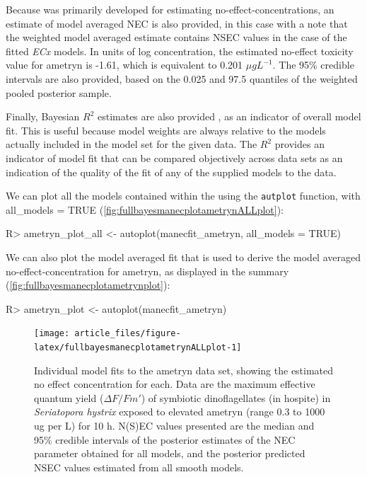 \documentclass[
  shortnames]{jss}
\begin{document}
Because  was primarily developed for estimating no-effect-concentrations, an estimate of model averaged NEC is also provided, in this case with a note that the weighted model averaged estimate contains NSEC \citep{Fisher2023} values in the case of the fitted \emph{ECx} models. In units of log concentration, the estimated no-effect toxicity value for ametryn is -1.61, which is equivalent to 0.201 \({\mu}gL^{-1}\). The 95\% credible intervals are also provided, based on the 0.025 and 97.5 quantiles of the weighted pooled posterior sample.

Finally, Bayesian \(R^2\) estimates are also provided \citep{gelman2019}, as an indicator of overall model fit. This is useful because model weights are always relative to the models actually included in the model set for the given data. The \(R^2\) provides an indicator of model fit that can be compared objectively across data sets as an indication of the quality of the fit of any of the supplied models to the data.

We can plot all the models contained within the  using the \texttt{autplot} function, with all\_models = TRUE (\autoref{fig:fullbayesmanecplotametrynALLplot}):

\begin{CodeChunk}
\begin{CodeInput}
R> ametryn_plot_all <- autoplot(manecfit_ametryn, all_models = TRUE)
\end{CodeInput}
\end{CodeChunk}

We can also plot the model averaged fit that is used to derive the model averaged no-effect-concentration for ametryn, as displayed in the summary (\autoref{fig:fullbayesmanecplotametrynplot}):

\begin{CodeChunk}
\begin{CodeInput}
R> ametryn_plot <- autoplot(manecfit_ametryn)
\end{CodeInput}
\end{CodeChunk}

\begin{CodeChunk}
\begin{figure}[!ht]

{\centering \texttt{[image: article\_files/figure-latex/fullbayesmanecplotametrynALLplot-1]} 

}

\caption{Individual model fits to the ametryn data set, showing the estimated no effect concentration for each. Data are the maximum effective quantum yield ($\Delta F / Fm'$) of symbiotic dinoflagellates (in hospite) in \textit{Seriatopora hystrix} exposed to elevated ametryn (range 0.3 to 1000 ug per L) for 10 h. N(S)EC values presented are the median and 95\% credible intervals of the posterior estimates of the NEC parameter obtained for all  models, and the posterior predicted NSEC values estimated from all smooth  models.}\label{fig:fullbayesmanecplotametrynALLplot}
\end{figure}
\end{CodeChunk}
\end{document}
